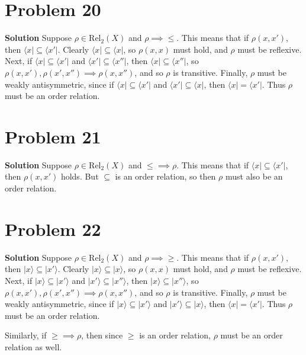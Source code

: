 \documentclass{article}
\begin{document}
\section{Problem 20}

\textbf{Solution } Suppose $\rho \in \text{Rel}_2(X)$ and $\rho \implies \leq$. This means that if $\rho(x, x')$, then $\langle x \rvert \subseteq \langle x' \rvert$. Clearly 
$\langle x \rvert \subseteq \langle x \rvert$, so $\rho(x, x)$ must hold, and $\rho$ must be reflexive. Next, if $\langle x \rvert \subseteq \langle x' \rvert$ and $\langle x' \rvert \subseteq \langle x'' \rvert$,
then $\langle x \rvert \subseteq \langle x'' \rvert$, so $\rho(x, x'), \rho(x', x'' ) \implies \rho(x, x'')$, and so $\rho$ is transitive. Finally, $\rho$ must be weakly antisymmetric, since if 
$\langle x \rvert \subseteq \langle x' \rvert$ and $\langle x' \rvert \subseteq \langle x \rvert$, then $\langle x \rvert = \langle x' \rvert$. Thus $\rho$ must be an order relation.


\section{Problem 21}

\textbf{Solution } Suppose $\rho \in \text{Rel}_2(X)$ and $\leq \implies \rho$. This means that if $\langle x \rvert \subseteq \langle x' \rvert$, then $\rho(x, x')$ holds. But $\subseteq$ is an
order relation, so then $\rho$ must also be an order relation.

\section{Problem 22} 

\textbf{Solution } Suppose $\rho \in \text{Rel}_2(X)$ and $\rho \implies \geq$. This means that if $\rho(x, x')$, then $\lvert x \rangle \subseteq \lvert x' \rangle$. Clearly 
$\lvert x \rangle \subseteq \lvert x \rangle$, so $\rho(x, x)$ must hold, and $\rho$ must be reflexive. Next, if $\lvert x \rangle \subseteq \lvert x' \rangle$ and $\lvert x' \rangle \subseteq \lvert x'' \rangle$,
then $\lvert x \rangle \subseteq \lvert x'' \rangle$, so $\rho(x, x'), \rho(x', x'' ) \implies \rho(x, x'')$, and so $\rho$ is transitive. Finally, $\rho$ must be weakly antisymmetric, since if 
$\lvert x \rangle \subseteq \lvert x' \rangle$ and $\lvert x' \rangle \subseteq \lvert x \rangle$, then $\langle x \rvert = \langle x' \rvert$. Thus $\rho$ must be an order relation.

Similarly, if $\geq \implies \rho$, then since $\geq$ is an order relation, $\rho$ must be an order relation as well.
\end{document}
